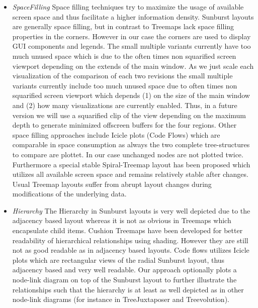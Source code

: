 \begin{itemize}
\item \emph{SpaceFilling} Space filling techniques try to maximize the usage of available screen space and thus facilitate a higher information density. Sunburst layouts are generally space filling, but in contrast to Treemaps lack space filling properties in the corners. However in our case the corners are used to display GUI components and legends. The small multiple variants currently have too much unused space which is due to the often times non squarified screen viewport depending on the extends of the main window. As we just scale each visualization of the comparison of each two revisions the small multiple variants currently include too much unused space due to often times non squarified screen viewport which depends (1) on the size of the main window and (2) how many visualizations are currently enabled. Thus, in a future version we will use a squarified clip of the view depending on the maximum depth to generate minimized offscreen buffers for the four regions. Other space filling approaches include Icicle plots (Code Flows) which are comparable in space consumption as always the two complete tree-structures to compare are plottet. In our case unchanged nodes are not plotted twice. Furthermore a special stable Spiral-Treemap layout has been proposed which utilizes all available screen space and remains relatively stable after changes. Usual Treemap layouts suffer from abrupt layout changes during modifications of the underlying data.
\item \emph{Hierarchy} The Hierarchy in Sunburst layouts is very well depicted due to the adjacency based layout whereas it is not as obvious in Treemaps which encapsulate child items. Cushion Treemaps have been developed for better readability of hierarchical relationships using shading. However they are still not as good readable as in adjacency based layouts. Code flows utilizes Icicle plots which are rectangular views of the radial Sunburst layout, thus adjacency based and very well readable. Our approach optionally plots a node-link diagram on top of the Sunburst layout to further illustrate the relationships such that the hierarchy is at least as well depicted as in other node-link diagrams (for instance in TreeJuxtaposer and Treevolution). 

\end{itemize}
